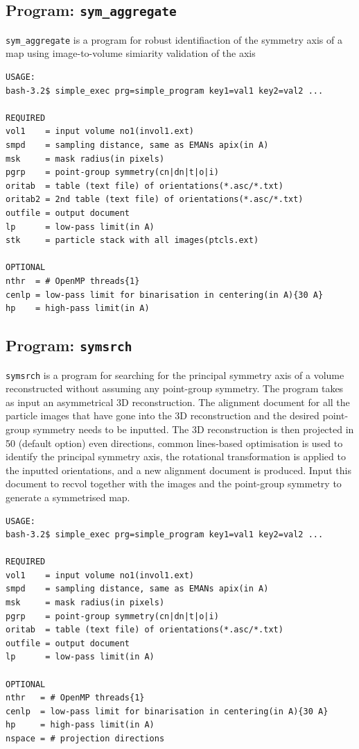 \documentclass[a4paper,11pt]{article}
\newcommand{\prgname}[1]{\textcolor{NavyBlue}{\texttt{#1}}}
\begin{document}
\subsection{Program: \prgname{sym\_aggregate}}
\label{sym_aggregate}
\prgname{sym\_aggregate} is a program for robust identifiaction of the symmetry axis of a map using image-to-volume simiarity validation of the axis

\begin{verbatim}
USAGE:
bash-3.2$ simple_exec prg=simple_program key1=val1 key2=val2 ...

REQUIRED
vol1    = input volume no1(invol1.ext)
smpd    = sampling distance, same as EMANs apix(in A)
msk     = mask radius(in pixels)
pgrp    = point-group symmetry(cn|dn|t|o|i)
oritab  = table (text file) of orientations(*.asc/*.txt)
oritab2 = 2nd table (text file) of orientations(*.asc/*.txt)
outfile = output document
lp      = low-pass limit(in A)
stk     = particle stack with all images(ptcls.ext)

OPTIONAL
nthr  = # OpenMP threads{1}
cenlp = low-pass limit for binarisation in centering(in A){30 A}
hp    = high-pass limit(in A)
\end{verbatim}

\subsection{Program: \prgname{symsrch}}
\label{symsrch}
\prgname{symsrch} is a program for searching for the principal symmetry axis of a volume reconstructed without assuming any point-group symmetry. The program takes as input an asymmetrical 3D reconstruction. The alignment document for all the particle images that have gone into the 3D reconstruction and the desired point-group symmetry needs to be inputted. The 3D reconstruction is then projected in 50 (default option) even directions, common lines-based optimisation is used to identify the principal symmetry axis, the rotational transformation is applied to the inputted orientations, and a new alignment document is produced. Input this document to recvol together with the images and the point-group symmetry to generate a symmetrised map.

\begin{verbatim}
USAGE:
bash-3.2$ simple_exec prg=simple_program key1=val1 key2=val2 ...

REQUIRED
vol1    = input volume no1(invol1.ext)
smpd    = sampling distance, same as EMANs apix(in A)
msk     = mask radius(in pixels)
pgrp    = point-group symmetry(cn|dn|t|o|i)
oritab  = table (text file) of orientations(*.asc/*.txt)
outfile = output document
lp      = low-pass limit(in A)

OPTIONAL
nthr   = # OpenMP threads{1}
cenlp  = low-pass limit for binarisation in centering(in A){30 A}
hp     = high-pass limit(in A)
nspace = # projection directions
\end{verbatim}
\end{document}
